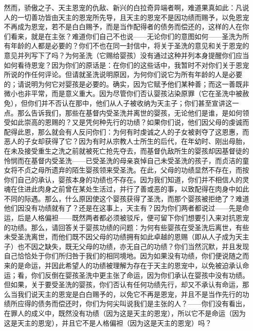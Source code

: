 然而，骄傲之子、天主恩宠的仇敌、新兴的白拉奇异端者啊，难道果真如此：凡说人的一切善功皆由天主的恩宠所先导，且天主的恩宠不是因功绩而赐予，以免恩宠不再成为恩宠，若不是白白赐予，而是当作配得者的债务而偿还的，这样的人在你们看来，就是在主张？难道你们自己不也说——无论你们的意图如何——圣洗为所有年龄的人都是必要的？你们不也在同一封信中，将关于圣洗的意见和关于恩宠的意见并列写下了吗？为何圣洗（它赐给婴孩）没有通过这种并列本身提醒你们应当如何看待恩宠？因为你们的原话是：在你们的这些话中，我暂时不对你们关于恩宠所说的作任何评论。但请就圣洗说明原因，为何你们说它为所有年龄的人是必要的；请说明为何它对婴孩是必要的。确实，因为它赋予他们某种善；而这一善既非微小也非平常，而是意义重大。因为尽管你们否认婴孩沾染原罪（它在圣洗中被赦免），但你们并不否认在那中，他们从人子被收纳为天主子；你们甚至宣讲这一点。那么告诉我们，那些在基督内受圣洗并离世的婴孩，无论他们是谁，是如何领受如此崇高的恩赐的？又是凭何种先行的功绩？如果你们说，他们因父母的虔诚而配得此恩，那么就会有人反问你们：为何有时虔诚之人的子女被剥夺了这恩惠，而恶人的子女却获得了它？因为有时从宗教人士所生的后代，在年幼时、刚出母胎，在未及接受重生之洗之前就被死亡抢先夺去，而基督仇敌所生的婴孩却因基督徒的怜悯而在基督内受圣洗——已受圣洗的母亲哀悼自己未受圣洗的孩子，而贞洁的童女将不贞之母所遗弃的陌生婴孩领来受圣洗。在此，父母的功绩显然不存在，而按你们自己的承认，婴孩本身的功绩也不存在。因为我们知道，你们并不相信人的灵魂在住进此肉身之前曾在某处生活过，并行了善或恶的事，以致配得在肉身中如此不同的际遇。那么，什么原因使这个婴孩获得了圣洗，而那个婴孩被拒绝了？难道他们因没有功绩就有了？还是在这事上，天主有？因为你们两者都说过——先是命运，后是人格偏袒——既然两者都必须被驳斥，便可留下你们想要引入来对抗恩宠的功绩。那么，请回答关于婴孩功绩的问题：为何有些婴孩在受圣洗后离世，有些未受圣洗离世，而他们既不因父母的功绩拥有如此卓越的恩赐（即从人子成为天主子）也不因之缺失，既无父母的功绩，亦无自己的功绩？你们当然沉默，并且发现自己恰恰处于你们所归咎于我们的相同境地。因为如果没有功绩，你们便说随之而来的是命运，并因此希望人的功绩被理解为存在于天主的恩宠中，以免被迫承认命运；看，你们反倒在婴孩圣洗中更主张了命运，因为你们承认在婴孩中没有功绩。但如果，关于要受圣洗的婴孩，你们否认有任何功绩先行，却又不承认有命运，那么当我们说天主的恩宠是白白赐予的，以免它不再是恩宠，并且不是当作先行的功绩所应得的债务而偿还时，你们为何尖叫说我们是主张的人？——你们没有看出，在罪人的成义中，既然没有功绩（因为这是天主的恩宠），所以它不是命运（因为这是天主的恩宠），并且它不是人格偏袒（因为这是天主的恩宠）吗？\par

